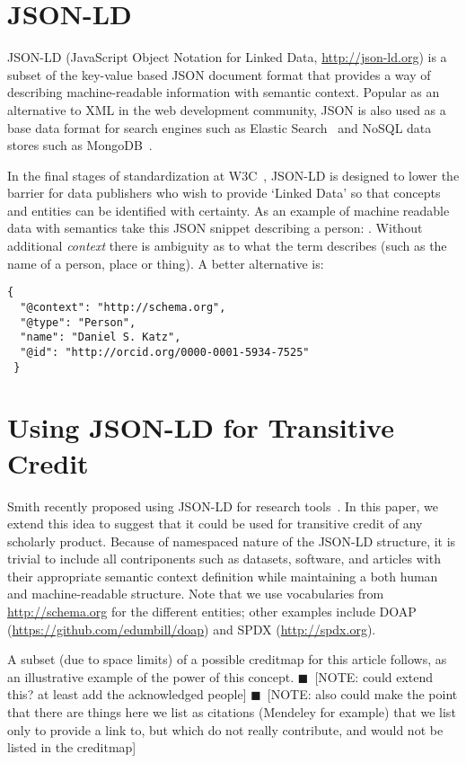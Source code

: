 \documentclass[a4paper,10pt]{article}
\newcommand{\note}[1]{{\color{darkgreen}$\blacksquare$~\textsf{[NOTE: #1]}}}
\begin{document}
\section{JSON-LD}


JSON-LD (JavaScript Object Notation for Linked Data, \url{http://json-ld.org}) is a subset of the key-value based JSON document format that provides a way of describing machine-readable information with semantic context. Popular as an alternative to XML in the web development community, JSON is also used as a base data format for search engines such as Elastic Search~\cite{elasticsearch} and NoSQL data stores such as MongoDB~\cite{mongodb}.

In the final stages of standardization at W3C~\cite{w3c}, JSON-LD is designed to lower the barrier for data publishers who wish to provide `Linked Data' so that concepts and entities can be identified with certainty. As an example of machine readable data with semantics take this JSON snippet describing a person: \jsonexample . Without additional \textit{context} there is ambiguity as to what the \name term describes (such as the name of a person, place or thing). A better alternative is:

{\footnotesize
\begin{verbatim}
{
  "@context": "http://schema.org",
  "@type": "Person",
  "name": "Daniel S. Katz",
  "@id": "http://orcid.org/0000-0001-5934-7525"
 }
\end{verbatim}
}


\section{Using JSON-LD for Transitive Credit}

Smith recently proposed using JSON-LD for research tools~\cite{arfon-json-ld-blog}. In this paper, we extend this idea to suggest that it could be used for transitive credit of any scholarly product. Because of namespaced nature of the JSON-LD structure, it is trivial to include all contriponents such as datasets, software, and articles with their appropriate semantic context definition while maintaining a both human and machine-readable structure. Note that we use vocabularies from \url{http://schema.org} for the different entities; other examples include DOAP (\url{https://github.com/edumbill/doap}) and SPDX (\url{http://spdx.org}).

A subset (due to space limits) of a possible creditmap for this article follows, as an illustrative example of the power of this concept. 
\note{could extend this? at least add the acknowledged people}
\note{also could make the point that there are things here we list as citations (Mendeley for example) that we list only to provide a link to, but which do not really contribute, and would not be listed in the creditmap}
\end{document}
